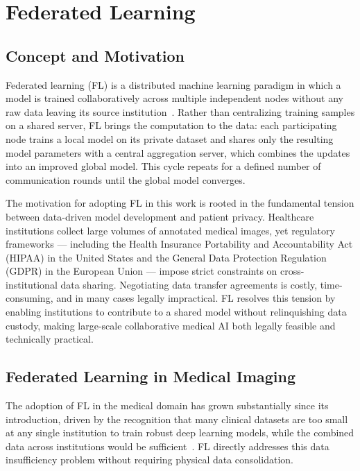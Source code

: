 \section{Federated Learning}
\subsection{Concept and Motivation}
\label{subsec:fl_concept}
 
Federated learning (FL) is a distributed machine learning paradigm in which
a model is trained collaboratively across multiple independent nodes without
any raw data leaving its source institution~\cite{mcmahan2017}. Rather than
centralizing training samples on a shared server, FL brings the computation
to the data: each participating node trains a local model on its private
dataset and shares only the resulting model parameters with a central
aggregation server, which combines the updates into an improved global model.
This cycle repeats for a defined number of communication rounds until the
global model converges.
 
The motivation for adopting FL in this work is rooted in the fundamental
tension between data-driven model development and patient privacy. Healthcare
institutions collect large volumes of annotated medical images, yet regulatory
frameworks --- including the Health Insurance Portability and Accountability Act
(HIPAA) in the United States and the General Data Protection Regulation (GDPR)
in the European Union --- impose strict constraints on cross-institutional data
sharing. Negotiating data transfer agreements is costly, time-consuming, and
in many cases legally impractical. FL resolves this tension by enabling
institutions to contribute to a shared model without relinquishing data
custody, making large-scale collaborative medical AI both legally feasible
and technically practical.
 
\subsection{Federated Learning in Medical Imaging}
\label{subsec:fl_medical}
 
The adoption of FL in the medical domain has grown substantially since its
introduction, driven by the recognition that many clinical datasets are too
small at any single institution to train robust deep learning models, while
the combined data across institutions would be sufficient~\cite{sheller2019}.
FL directly addresses this data insufficiency problem without requiring
physical data consolidation.
 
